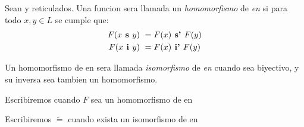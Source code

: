 \begin{definition}
  Sean \reticulAlg y  reticulados. Una funcion 
  sera llamada un \emph{homomorfismo} de \reticulAlg \emph{en}  si
  para todo $x, y \in L$ se cumple que:
  \begin{alignat*}{2}
    F(x\textbf{ s }y) &\ = F(x)\textbf{ s' }F(y)\\
    F(x\textbf{ i }y) &\ = F(x)\textbf{ i' }F(y)\\    
  \end{alignat*}

  Un homomorfismo de \reticulAlg en  sera llamada \emph{isomorfismo}
  de \reticulAlg \emph{en}  cuando sea biyectivo, y su inversa
  sea tambien un homomorfismo.

  Escribiremos  cuando $F$ sea un homomorfismo
  de \reticulAlg en 

  Escribiremos \reticulAlg $\tilde{=}$  cuando exista
  un isomorfismo de \reticulAlg en 
\end{definition}

